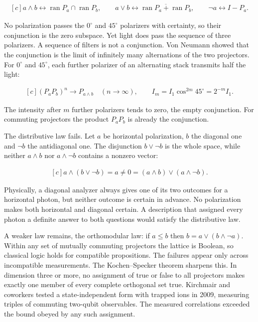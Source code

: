 \documentclass[11pt,oneside]{book}
\newenvironment{centeredalign}{\[\begin{gathered}[c]}{\end{gathered}\]}
\begin{document}
\begin{centeredalign}
a\wedge b\leftrightarrow \operatorname{ran}P_a\cap\operatorname{ran}P_b,\qquad
a\vee b\leftrightarrow \overline{\operatorname{ran}P_a+\operatorname{ran}P_b},\qquad
\neg a\leftrightarrow I-P_a.
\end{centeredalign}

No polarization passes the \(0^\circ\) and \(45^\circ\) polarizers with certainty, so their conjunction is the zero subspace. Yet light does pass the sequence of three polarizers. A sequence of filters is not a conjunction. Von Neumann showed that the conjunction is the limit of infinitely many alternations of the two projectors. For \(0^\circ\) and \(45^\circ\), each further polarizer of an alternating stack transmits half the light:

\begin{centeredalign}
(P_aP_b)^n\longrightarrow P_{a\wedge b}\quad(n\to\infty),\qquad
I_m=I_1\cos^{2m}45^\circ=2^{-m}I_1.
\end{centeredalign}

The intensity after \(m\) further polarizers tends to zero, the empty conjunction. For commuting projectors the product \(P_aP_b\) is already the conjunction.

The distributive law fails. Let \(a\) be horizontal polarization, \(b\) the diagonal one and \(\neg b\) the antidiagonal one. The disjunction \(b\vee\neg b\) is the whole space, while neither \(a\wedge b\) nor \(a\wedge\neg b\) contains a nonzero vector:

\begin{centeredalign}
a\wedge(b\vee\neg b)=a\neq0=(a\wedge b)\vee(a\wedge\neg b).
\end{centeredalign}

Physically, a diagonal analyzer always gives one of its two outcomes for a horizontal photon, but neither outcome is certain in advance. No polarization makes both horizontal and diagonal certain. A description that assigned every photon a definite answer to both questions would satisfy the distributive law.

A weaker law remains, the orthomodular law: if \(a\leq b\) then \(b=a\vee(b\wedge\neg a)\). Within any set of mutually commuting projectors the lattice is Boolean, so classical logic holds for compatible propositions. The failures appear only across incompatible measurements. The Kochen--Specker theorem sharpens this. In dimension three or more, no assignment of true or false to all projectors makes exactly one member of every complete orthogonal set true. Kirchmair and coworkers tested a state-independent form with trapped ions in 2009, measuring triples of commuting two-qubit observables. The measured correlations exceeded the bound obeyed by any such assignment.
\end{document}
